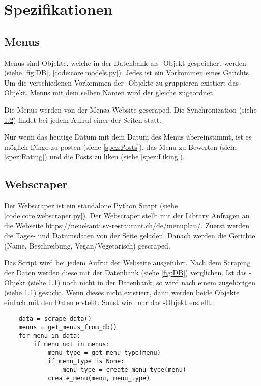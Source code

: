 \chapter{Spezifikationen}

\section{Menus} \label{spez:Menus}

Menus sind Objekte, welche in der Datenbank als -Objekt gespeichert
werden (siehe \ref{fig:DB}, \ref{code:core.models.py}). Jedes  ist
ein Vorkommen eines Gerichts. Um die verschiedenen Vorkommen der
-Objekte zu gruppieren existiert das -Objekt.
Menus mit dem selben Namen wird der gleiche  zugeordnet

Die Menus werden von der Mensa-Website gescraped. Die Synchronization (siehe
\ref{spez:Webscraper}) findet bei jedem Aufruf einer der Seiten statt.

Nur wenn das heutige Datum mit dem Datum des Menus übereinstimmt, ist es möglich
Dinge zu posten (siehe \ref{spez:Posts}), das Menu zu Bewerten (siehe
\ref{spez:Rating}) und die Posts zu liken (siehe \ref{spez:Liking}).





\section{Webscraper} \label{spez:Webscraper}

Der Webscraper ist ein standalone Python Script (siehe
\ref{code:core.webscraper.py}). Der Webscraper stellt mit der Library
 Anfragen an die Webseite
\url{https://neuekanti.sv-restaurant.ch/de/menuplan/}. Zuerst werden die Tages-
und Datumsdaten von der Seite geladen. Danach werden die Gerichte (Name,
Beschreibung, Vegan/Vegetarisch) gescraped.

Das Script wird bei jedem Aufruf der Webseite ausgeführt. Nach dem Scraping
der Daten werden diese mit der Datenbank (siehe \ref{fig:DB}) verglichen.
Ist das -Objekt (siehe \ref{spez:Menus}) noch nicht in der Datenbank,
so wird nach einem zugehörigen  (siehe \ref{spez:Menus})
gesucht. Wenn dieses nicht existiert, dann werden beide Objekte einfach mit den
Daten erstellt. Sonst wird nur das -Objekt erstellt.

\begin{lstlisting}
    data = scrape_data()
    menus = get_menus_from_db()
    for menu in data:
        if menu not in menus:
            menu_type = get_menu_type(menu)
            if menu_type is None:
                menu_type = create_menu_type(menu)
            create_menu(menu, menu_type)
\end{lstlisting}

